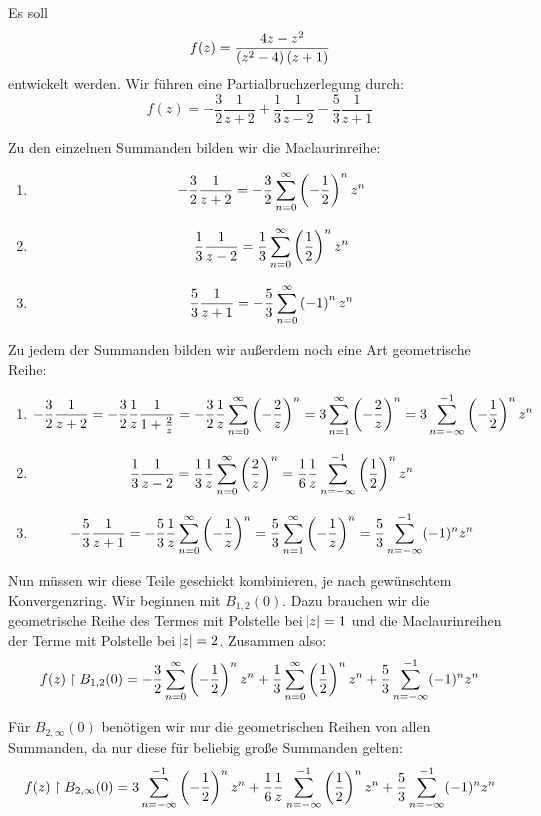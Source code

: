 Es soll
\[
	f(z) = \frac{4z-z^2}{\del{z^2-4}\del{z+1}}
\]
entwickelt werden. Wir führen eine Partialbruchzerlegung durch:
\[
	f(z) = - \frac32\frac1{z+2} + \frac13\frac1{z-2} - \frac53\frac1{z+1}
\]

Zu den einzelnen Summanden bilden wir die Maclaurinreihe:
\begin{enumerate}
	\item
		\[
			- \frac32\frac1{z+2}
			= - \frac 32 \sum_{n=0}^\infty \del{-\frac 12}^n z^n
		\]

	\item
		\[
			\frac13\frac1{z-2}
			= \frac 13 \sum_{n=0}^\infty \del{\frac 12}^n z^n
		\]

	\item
		\[
			\frac53\frac1{z+1}
			= - \frac 53 \sum_{n=0}^\infty \del{-1}^n z^n
		\]
\end{enumerate}

Zu jedem der Summanden bilden wir außerdem noch eine Art geometrische Reihe:
\begin{enumerate}
	\item
		\[
			- \frac 32 \frac{1}{z+2}
			= - \frac 32 \frac 1z \frac{1}{1+\frac 2z}
			= - \frac 32 \frac 1z \sum_{n=0}^\infty \del{-\frac 2z}^n
			= 3 \sum_{n=1}^\infty \del{-\frac 2z}^n
			= 3 \sum_{n=-\infty}^{-1} \del{-\frac 12}^n z^n
		\]

	\item
		\[
			\frac 13 \frac{1}{z-2}
			= \frac 13 \frac 1z \sum_{n=0}^{\infty} \del{\frac 2z}^n
			= \frac 16 \frac 1z \sum_{n=-\infty}^{-1} \del{\half}^n z^n
		\]

	\item
		\[
			- \frac 53 \frac{1}{z+1}
			= - \frac 53 \frac 1z \sum_{n=0}^\infty \del{-\frac 1z}^n
			= \frac 53 \sum_{n=1}^\infty \del{-\frac 1z}^n
			= \frac 53 \sum_{n=-\infty}^{-1} (-1)^n z^n
		\]
\end{enumerate}

Nun müssen wir diese Teile geschickt kombinieren, je nach gewünschtem
Konvergenzring. Wir beginnen mit $B_{1,2}(0)$. Dazu brauchen wir die geometrische Reihe des Termes mit Polstelle bei $\abs z = 1$ und die Maclaurinreihen der Terme mit Polstelle bei $\abs z = 2$. Zusammen also:
\[
	f(z) \restriction B_{1,2}(0)
	=
	- \frac 32 \sum_{n=0}^\infty \del{-\frac 12}^n z^n
	+ \frac 13 \sum_{n=0}^\infty \del{\frac 12}^n z^n
	+ \frac 53 \sum_{n=-\infty}^{-1} (-1)^n z^n
\]

Für $B_{2,\infty}(0)$ benötigen wir nur die geometrischen Reihen von allen
Summanden, da nur diese für beliebig große Summanden gelten:
\[
	f(z) \restriction B_{2,\infty}(0)
	=
	3 \sum_{n=-\infty}^{-1} \del{-\frac 12}^n z^n
	+ \frac 16 \frac 1z \sum_{n=-\infty}^{-1} \del{\half}^n z^n
	+ \frac 53 \sum_{n=-\infty}^{-1} (-1)^n z^n
\]

